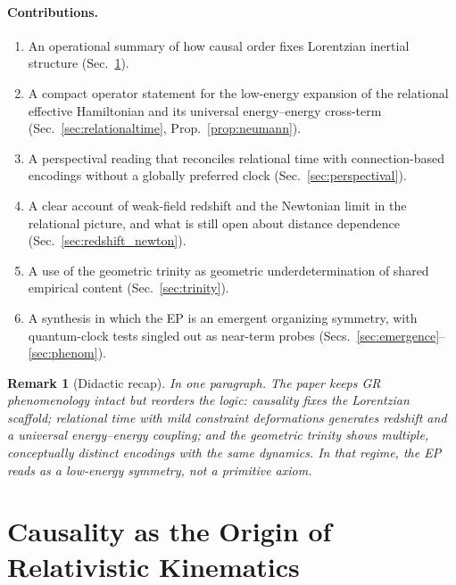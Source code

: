 \documentclass[11pt,a4paper]{article}
\theoremstyle{thmstyleone}
\theoremstyle{thmstyletwo}
\newtheorem{remark}{Remark}
\theoremstyle{thmstylethree}
\begin{document}
        \paragraph{Contributions.}
            \begin{enumerate}
                \item An operational summary of how causal order fixes Lorentzian inertial structure (Sec.~\ref{sec:causality}).
                \item A compact operator statement for the low-energy expansion of the relational effective Hamiltonian and its universal energy--energy cross-term (Sec.~\ref{sec:relationaltime}, Prop.~\ref{prop:neumann}).
                \item A perspectival reading that reconciles relational time with connection-based encodings without a globally preferred clock (Sec.~\ref{sec:perspectival}).
                \item A clear account of weak-field redshift and the Newtonian limit in the relational picture, and what is still open about distance dependence (Sec.~\ref{sec:redshift_newton}).
                \item A use of the geometric trinity as geometric underdetermination of shared empirical content (Sec.~\ref{sec:trinity}).
                \item A synthesis in which the EP is an emergent organizing symmetry, with quantum-clock tests singled out as near-term probes (Secs.~\ref{sec:emergence}--\ref{sec:phenom}).
            \end{enumerate}

            \begin{remark}[Didactic recap]
                \emph{In one paragraph.} The paper keeps GR phenomenology intact but reorders the logic: causality fixes the Lorentzian scaffold; relational time with mild constraint deformations generates redshift and a universal energy--energy coupling; and the geometric trinity shows multiple, conceptually distinct encodings with the same dynamics. In that regime, the EP reads as a low-energy symmetry, not a primitive axiom.
            \end{remark}

    \section{Causality as the Origin of Relativistic Kinematics}\label{sec:causality}
\end{document}
